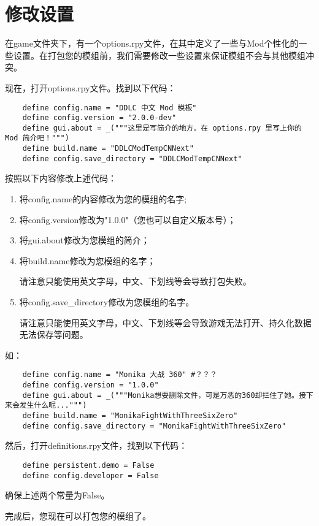 \section{修改设置}

在game文件夹下，有一个options.rpy文件，在其中定义了一些与Mod个性化的一些设置。在打包您的模组前，我们需要修改一些设置来保证模组不会与其他模组冲突。

现在，打开options.rpy文件。找到以下代码：
\begin{lstlisting}
    define config.name = "DDLC 中文 Mod 模板"
    define config.version = "2.0.0-dev"
    define gui.about = _("""这里是写简介的地方。在 options.rpy 里写上你的 Mod 简介吧！""")
    define build.name = "DDLCModTempCNNext"
    define config.save_directory = "DDLCModTempCNNext"
\end{lstlisting}

按照以下内容修改上述代码：
\begin{enumerate}
    \item 将config.name的内容修改为您的模组的名字;
    \item 将config.version修改为"1.0.0"（您也可以自定义版本号）；
    \item 将gui.about修改为您模组的简介；
    \item 将build.name修改为您模组的名字；
    \begin{Attention}
        请注意只能使用英文字母，中文、下划线等会导致打包失败。
    \end{Attention}
    \item 将config.save\_directory修改为您模组的名字。
    \begin{Attention}
        请注意只能使用英文字母，中文、下划线等会导致游戏无法打开、持久化数据无法保存等问题。
    \end{Attention}
\end{enumerate}
如：
\begin{lstlisting}
    define config.name = "Monika 大战 360" #？？？
    define config.version = "1.0.0"
    define gui.about = _("""Monika想要删除文件，可是万恶的360却拦住了她。接下来会发生什么呢...""")
    define build.name = "MonikaFightWithThreeSixZero"
    define config.save_directory = "MonikaFightWithThreeSixZero"
\end{lstlisting}

然后，打开definitions.rpy文件，找到以下代码：
\begin{lstlisting}
    define persistent.demo = False
    define config.developer = False
\end{lstlisting}

确保上述两个常量为False。

完成后，您现在可以打包您的模组了。